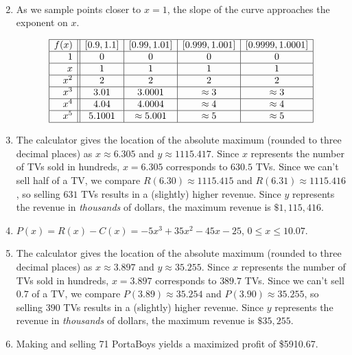 \begin{enumerate}
\[\begin{array}{|r||c|c|c|c|c|c|}
\end{array} \]


\item As we sample points closer to $x=1$, the slope of the curve approaches the exponent on $x$.

\[ \begin{array}{|r||c|c|c|c|}  \hline

 f(x) &  [0.9, 1.1] & [0.99, 1.01] &[0.999, 1.001] & [0.9999, 1.0001]  \\ \hline
 1 &  0 &   0  & 0   & 0   \\  \hline
 x &  1 &   1  & 1   & 1   \\  \hline
 x^2 & 2 & 2 & 2 & 2  \\  \hline
 x^3 & 3.01  & 3.0001 & \approx 3 & \approx 3  \\  \hline
 x^4&  4.04 & 4.0004 & \approx 4 & \approx 4 \\ \hline
 x^5 & 5.1001 & \approx 5.001 & \approx 5 & \approx 5  \\ \hline

\end{array} \]


\item The calculator gives the location  of the absolute maximum (rounded to three decimal places) as $x \approx 6.305$ and $y \approx 1115.417$.  Since $x$ represents the number of TVs sold in hundreds, $x = 6.305$ corresponds to $630.5$ TVs.  Since we can't sell half of a TV, we compare $R(6.30) \approx 1115.415$ and $R(6.31) \approx 1115.416$, so selling $631$ TVs results in a (slightly) higher revenue.  Since $y$ represents the revenue in \textit{thousands} of dollars, the maximum revenue is $\$ 1,\!115,\!416$.

\item $P(x) = R(x) - C(x) = -5x^3+35x^2-45x-25$, $0 \leq x \leq 10.07$.

\item  The calculator gives the location  of the absolute maximum (rounded to three decimal places) as $x \approx 3.897$ and $y \approx 35.255$.  Since $x$ represents the number of TVs sold in hundreds, $x = 3.897$ corresponds to $389.7$ TVs.  Since we can't sell $0.7$ of a TV, we compare $P(3.89) \approx 35.254$ and $P(3.90) \approx 35.255$, so selling $390$ TVs results in a (slightly) higher revenue.  Since $y$ represents the revenue in \textit{thousands} of dollars, the maximum revenue is $\$ 35,\!255$.

\item Making and selling 71 PortaBoys yields a maximized profit of \$5910.67.



\end{enumerate}
